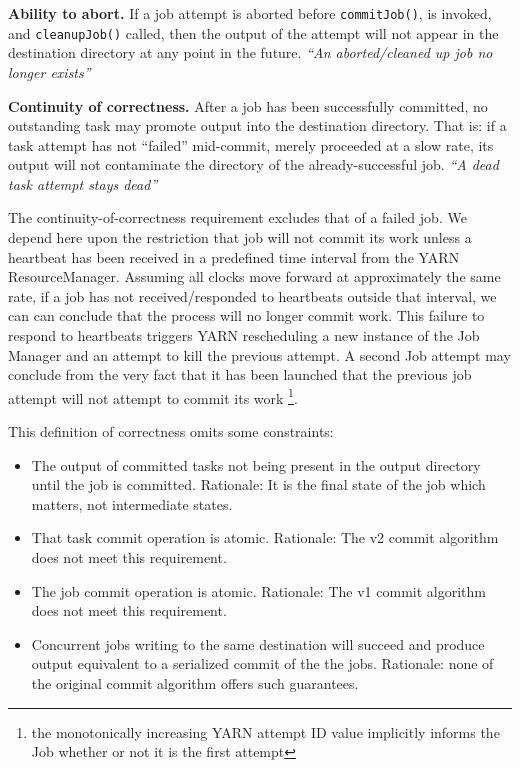 \documentclass[format=acmsmall, screen=true, review=false]{acmart}
\begin{document}
\begin{paragraph}
  \textbf{Ability to abort.}
  If a job attempt is aborted before \texttt{commitJob()}, is invoked, and
  \texttt{cleanupJob()} called, then the output of the attempt will not appear in the
  destination directory at any point in the future.
  \emph{``An aborted/cleaned up job no longer exists''}
\end{paragraph}


\begin{paragraph}
  \textbf{Continuity of correctness.}
  After a job has been successfully committed, no outstanding task may promote
  output into the destination directory.
  That is: if a task attempt has not ``failed'' mid-commit, merely proceeded at a slow rate,
  its output will not contaminate the directory of the already-successful job.
  \emph{``A dead task attempt stays dead''}
\end{paragraph}


The continuity-of-correctness requirement excludes that of a failed job.
We depend here upon the restriction that job will not commit its work unless
a heartbeat has been received in a predefined time interval from the YARN ResourceManager.
Assuming all clocks move forward at approximately the same rate, if a job has
not received/responded to heartbeats outside that interval,
we can can conclude that the process will no longer commit work.
This failure to respond to heartbeats triggers YARN rescheduling a new
instance of the Job Manager and an attempt to kill the previous attempt.
A second Job attempt may conclude from the very fact that it has been launched
that the previous job attempt will not attempt to commit its work
\footnote{the monotonically increasing YARN attempt ID value implicitly
informs the Job whether or not it is the first attempt}.

This definition of correctness omits some constraints:

\begin{itemize}
  \item The output of committed tasks not being present in the output directory
  until the job is committed.
  Rationale: It is the final state of the job which matters, not intermediate states.

  \item That task commit operation is atomic.
  Rationale: The v2 commit algorithm does not meet this requirement.

  \item The job commit operation is atomic.
  Rationale: The v1 commit algorithm does not meet this requirement.

  \item Concurrent jobs writing to the same destination will succeed and
  produce output equivalent to a serialized commit of the the jobs.
  Rationale: none of the original commit algorithm offers such guarantees.
\end{itemize}
\end{document}
